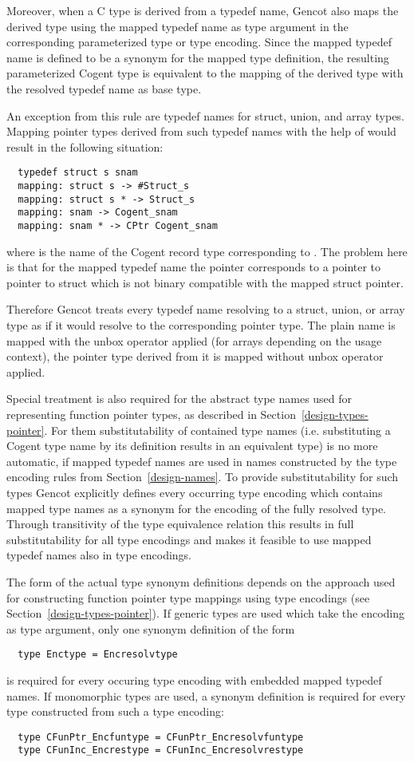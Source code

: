 Moreover, when a C type is derived from a typedef name, Gencot also maps the derived type using the mapped typedef name
as type argument in the corresponding parameterized type or type encoding. Since the mapped typedef name is defined to be a synonym 
for the mapped type definition, the resulting parameterized Cogent type is equivalent to the mapping of the derived 
type with the resolved typedef name as base type.

An exception from this rule are typedef names for struct, union, and array types. Mapping pointer types derived 
from such typedef names with the help of  would result in the following situation:
\begin{verbatim}
  typedef struct s snam
  mapping: struct s -> #Struct_s
  mapping: struct s * -> Struct_s
  mapping: snam -> Cogent_snam
  mapping: snam * -> CPtr Cogent_snam
\end{verbatim}
where  is the name of the Cogent record type corresponding to . The problem here
is that for the mapped typedef name the pointer corresponds to a pointer to pointer to struct which is not binary 
compatible with the mapped struct pointer.

Therefore Gencot treats every typedef name resolving to a struct, union, or array type as if 
it would resolve to the corresponding pointer type. The plain name is mapped with the unbox operator 
applied (for arrays depending on the usage context), the pointer type derived from it is mapped without 
unbox operator applied. 

Special treatment is also required for the abstract type names used for representing function pointer types, as
described in Section~\ref{design-types-pointer}. For them substitutability of contained type names (i.e. substituting
a Cogent type name by its definition results in an equivalent type) is no more automatic, if mapped typedef names 
are used in names constructed by the type encoding rules from Section~\ref{design-names}. To provide substitutability
for such types Gencot explicitly defines every occurring type encoding which contains mapped type names as a synonym for the
encoding of the fully resolved type. Through transitivity of the type equivalence relation this results in full
substitutability for all type encodings and makes it feasible to use mapped typedef names also in type encodings.

The form of the actual type synonym definitions depends on the approach used for constructing function pointer type 
mappings using type encodings (see Section~\ref{design-types-pointer}). If generic types are used which take the encoding
as type argument, only one synonym definition of the form 
\begin{verbatim}
  type Enctype = Encresolvtype
\end{verbatim}
is required for every occuring type encoding  with embedded mapped typedef names. If monomorphic types are
used, a synonym definition is required for every type constructed from such a type encoding:
\begin{verbatim}
  type CFunPtr_Encfuntype = CFunPtr_Encresolvfuntype
  type CFunInc_Encrestype = CFunInc_Encresolvrestype
\end{verbatim}

